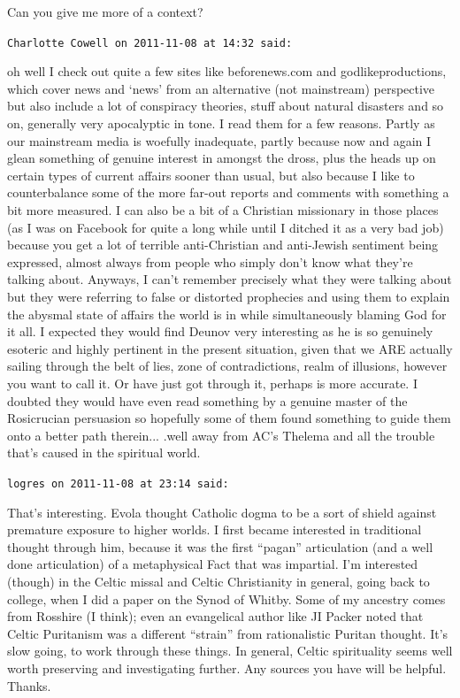 \begin{footnotesize}
\begin{sffamily}
Can you give me more of a context?

\hfill

\texttt{Charlotte Cowell on 2011-11-08 at 14:32 said:}

oh well I check out quite a few sites like beforenews.com and godlikeproductions, which cover news and `news' from an alternative (not mainstream) perspective but also include a lot of conspiracy theories, stuff about natural disasters and so on, generally very apocalyptic in tone. I read them for a few reasons. Partly as our mainstream media is woefully inadequate, partly because now and again I glean something of genuine interest in amongst the dross, plus the heads up on certain types of current affairs sooner than usual, but also because I like to counterbalance some of the more far-out reports and comments with something a bit more measured. I can also be a bit of a Christian missionary in those places (as I was on Facebook for quite a long while until I ditched it as a very bad job) because you get a lot of terrible anti-Christian and anti-Jewish sentiment being expressed, almost always from people who simply don't know what they're talking about. Anyways, I can't remember precisely what they were talking about but they were referring to false or distorted prophecies and using them to explain the abysmal state of affairs the world is in while simultaneously blaming God for it all. I expected they would find Deunov very interesting as he is so genuinely esoteric and highly pertinent in the present situation, given that we ARE actually sailing through the belt of lies, zone of contradictions, realm of illusions, however you want to call it. Or have just got through it, perhaps is more accurate. I doubted they would have even read something by a genuine master of the Rosicrucian persuasion so hopefully some of them found something to guide them onto a better path therein... .well away from AC's Thelema and all the trouble that's caused in the spiritual world.

\hfill

\texttt{logres on 2011-11-08 at 23:14 said:}

That's interesting. Evola thought Catholic dogma to be a sort of shield against premature exposure to higher worlds. I first became interested in traditional thought through him, because it was the first ``pagan'' articulation (and a well done articulation) of a metaphysical Fact that was impartial. I'm interested (though) in the Celtic missal and Celtic Christianity in general, going back to college, when I did a paper on the Synod of Whitby. Some of my ancestry comes from Rosshire (I think); even an evangelical author like JI Packer noted that Celtic Puritanism was a different ``strain'' from rationalistic Puritan thought. It's slow going, to work through these things. In general, Celtic spirituality seems well worth preserving and investigating further. Any sources you have will be helpful. Thanks.


\end{sffamily}
\end{footnotesize}

